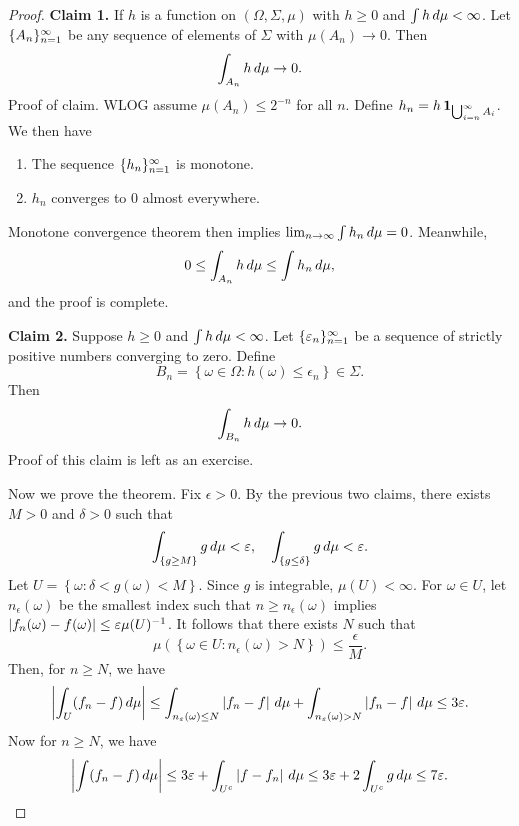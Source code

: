 \documentclass[a4paper]{article}
\begin{document}
\begin{proof}
  \textbf{Claim 1.}
  If $h$ is a function on $(\Omega, \Sigma, \mu)$ with
  $h \geq 0$ and $\int h \, d \mu < \infty$. Let $\{ A_n \}_{n=1}^\infty$
  be any sequence of elements of $\Sigma$ with $\mu (A_n) \to 0$.
  Then
  \[
    \int_{A_n} h \, d \mu \to 0.
  \]
  Proof of claim. WLOG assume $\mu(A_n) \leq 2^{-n}$ for all $n$.
  Define $h_n = h \operatorname{\mathbf{1}}_{\bigcup_{i=n}^\infty A_i}$. We then have
  \begin{enumerate}
    \item The sequence $\{ h_n \}_{n=1}^\infty$ is monotone.
    \item $h_n$ converges to $0$ almost everywhere.
  \end{enumerate}
  Monotone convergence theorem then implies $\lim_{n \to \infty}
    \int h_n \, d \mu = 0$. Meanwhile,
  \[
    0 \leq \int_{A_n} h \, d \mu \leq \int h_n \, d \mu,
  \]
  and the proof is complete.

  \textbf{Claim 2.}
  Suppose $h \geq 0$ and $\int h \, d \mu < \infty$.
  Let $\{ \varepsilon_n \}_{n=1}^\infty$ be a sequence of strictly positive numbers
  converging to zero. Define
  \[
    B_n = \left\{ \omega \in \Omega : h (\omega) \leq \epsilon_n \right\}
    \in \Sigma.
  \]
  Then
  \[
    \int_{B_n} h \, d \mu \to 0.
  \]
  Proof of this claim is left as an exercise.

  Now we prove the theorem. Fix $\epsilon > 0$. By the previous two
  claims, there exists $M > 0$ and $\delta > 0$ such that
  \[
    \int_{\left\{ g \geq M \right\}} g \, d \mu < \varepsilon,
    \quad
    \int_{\left\{ g \leq \delta \right\}} g \, d \mu < \varepsilon.
  \]
  Let $U = \left\{ \omega : \delta < g(\omega) < M \right\}$.
  Since $g$ is integrable, $\mu (U) < \infty$.
  For $\omega \in U$, let $n_\epsilon (\omega)$ be the smallest
  index such that $n \geq n_\epsilon (\omega)$ implies
  $\left\lvert f_n (\omega) - f(\omega)\right\rvert \leq \varepsilon \mu(U)^{-1}$.
  It follows that there exists $N$ such that
  \[
    \mu \left( \left\{ \omega \in U: n_\epsilon (\omega) > N \right\}  \right)
    \leq \frac{\epsilon}{M}.
  \]
  Then, for $n \geq N$, we have
  \begin{align*}
    \left\lvert \int_U (f_n - f) \, d \mu\right\rvert
    \leq \int_{n_\varepsilon (\omega) \leq N} \left\lvert f_n - f\right\rvert \, d \mu
    + \int_{n_\varepsilon (\omega) > N} \left\lvert f_n - f\right\rvert \, d \mu
    \leq 3 \varepsilon.
  \end{align*}
  Now for $n \geq N$, we have
  \[
    \left\lvert \int (f_n - f) \, d \mu\right\rvert
    \leq 3 \varepsilon + \int_{U^c} \left\lvert f - f_n\right\rvert \, d \mu
    \leq 3 \varepsilon + 2 \int_{U^c} g \, d \mu \leq 7 \varepsilon.
  \]

\end{proof}
\end{document}
